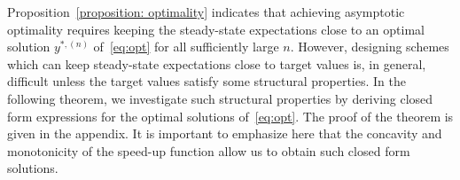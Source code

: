 \documentclass[a4paper]{article}
\theoremstyle{plain}
\theoremstyle{definition}
\theoremstyle{case}
\theoremstyle{remark}
\newcommand{\norm}[1]{\left\lVert#1\right\rVert}
\newcommand{\sbrac}[1]{\left[#1\right]}
\newcommand{\expect}[1]{\mathbb{E}\sbrac{#1}}
\begin{document}
Proposition~\ref{proposition: optimality} indicates that achieving asymptotic optimality requires keeping the steady-state expectations close to an optimal solution $y^{*,(n)}$ of~\eqref{eq:opt} for all sufficiently large $n$. 
However, designing schemes which can keep steady-state expectations close to target values is, in general, difficult unless the target values satisfy some structural properties.
In the following theorem, we investigate such structural properties by deriving closed form expressions for the optimal solutions of~\eqref{eq:opt}. The proof of the theorem is given in the appendix. 
It is important to emphasize here that the concavity and monotonicity of the speed-up function allow us to obtain such closed form solutions.
\end{document}
